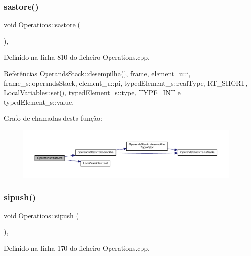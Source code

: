 \subsubsection{\texorpdfstring{sastore()}{sastore()}}
{\footnotesize\ttfamily void Operations\+::sastore (\begin{DoxyParamCaption}{ }\end{DoxyParamCaption})\hspace{0.3cm}{\ttfamily [static]}, {\ttfamily [private]}}



Definido na linha 810 do ficheiro Operations.\+cpp.



Referências Operands\+Stack\+::desempilha(), frame, element\+\_\+u\+::i, frame\+\_\+s\+::operands\+Stack, element\+\_\+u\+::pi, typed\+Element\+\_\+s\+::real\+Type, R\+T\+\_\+\+S\+H\+O\+RT, Local\+Variables\+::set(), typed\+Element\+\_\+s\+::type, T\+Y\+P\+E\+\_\+\+I\+NT e typed\+Element\+\_\+s\+::value.

Grafo de chamadas desta função\+:
\nopagebreak
\begin{figure}[H]
\begin{center}
\leavevmode
\includegraphics[width=350pt]{classOperations_aab1c34c455478d75c21cdb06d6c94172_cgraph}
\end{center}
\end{figure}
\mbox{\label{classOperations_aed3838c73d7febfcacab9f101e6946ad}} 
\subsubsection{\texorpdfstring{sipush()}{sipush()}}
{\footnotesize\ttfamily void Operations\+::sipush (\begin{DoxyParamCaption}{ }\end{DoxyParamCaption})\hspace{0.3cm}{\ttfamily [static]}, {\ttfamily [private]}}



Definido na linha 170 do ficheiro Operations.\+cpp.



